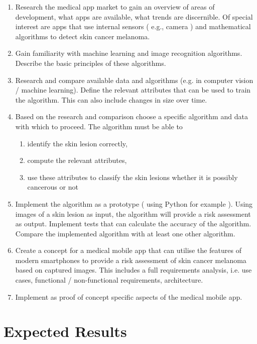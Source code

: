 \noindent
\begin{enumerate}
\item Research the medical app market to gain an overview of areas of development, what apps are available, what trends are discernible. Of special interest are apps that use internal sensors ( e.g., camera ) and mathematical algorithms to detect skin cancer melanoma.

\item Gain familiarity with machine learning and image recognition algorithms. Describe the basic principles of these algorithms.
\item Research and compare available data and algorithms (e.g. in computer vision / machine learning). Define the relevant attributes that can be used to train the algorithm. This can also include changes in size over time.

\item Based on the research and comparison choose a specific algorithm and data with which to proceed. The algorithm must be able to
\begin{enumerate}
\item identify the skin lesion correctly,
\item compute the relevant attributes,
\item use these attributes to classify the skin lesions whether it is possibly cancerous or not
\end{enumerate}
\item Implement the algorithm as a prototype ( using Python for example ). Using images of a skin lesion as input, the algorithm will provide a risk assessment as output. Implement tests that can calculate the accuracy of the algorithm. Compare the implemented algorithm with at least one other algorithm.

\item Create a concept for a medical mobile app that can utilise the features of modern smartphones to provide a risk assessment of skin cancer melanoma based on captured images. This includes a full requirements analysis, i.e. use cases, functional / non-functional requirements, architecture.

\item Implement as proof of concept specific aspects of the medical mobile app.

\end{enumerate}

\section{Expected Results}

